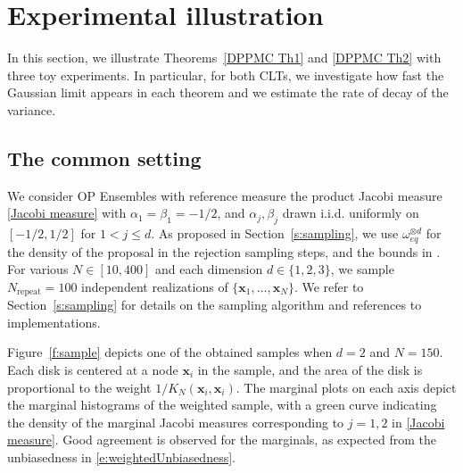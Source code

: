 \documentclass[a4paper,11pt]{article}
\numberwithin{equation}{section}
\theoremstyle{definition}
\newcommand{\rev}[1]{#1}
\newcommand{\bs}{\boldsymbol}
\newcommand{\bv}{\mathbf}
\renewcommand{\leq}{\leqslant}
\renewcommand{\phi}{\varphi}
\def\bx{{\bv x}}
\begin{document}



\section{Experimental illustration}
\label{s:experiments}
\rev{In this section, we illustrate Theorems~\ref{DPPMC Th1} and \ref{DPPMC Th2} with three toy experiments}. In particular, for both CLTs, we investigate how
fast the Gaussian limit appears in each theorem and we estimate the rate of decay of the variance.

\subsection{The common setting}
\label{s:commonSetting}
We consider OP Ensembles with reference measure the product Jacobi measure
\eqref{Jacobi measure} with $\alpha_1=\beta_1=-1/2$, and $\alpha_j,\beta_j$
drawn i.i.d. uniformly on $[-1/2,1/2]$ for $1 < j\leq d$. As proposed in
Section~\ref{s:sampling}, we use \rev{$\omega_{eq}^{\otimes d}$} for the density of the proposal in the rejection sampling steps, and the bounds in \citep{Gau09}. For various $N\in [10,400]$ and each dimension $d\in \{1,2,3\}$, we sample $N_{\text{repeat}} = 100$ independent realizations of $\{\bx_1,\dots,\bx_N\}$. We refer to Section~\ref{s:sampling} for details on the sampling algorithm and references to implementations.

Figure~\ref{f:sample} depicts one of the obtained samples when $d=2$ and $N=150$. Each disk is centered at a node $\bv x_i$ in the sample, and the area of the disk is proportional to the weight $1/K_N(\bv x_i,\bv x_i)$. The marginal plots on each axis
depict the marginal histograms of the  weighted sample, with a green curve
indicating the density of the marginal Jacobi measures corresponding to $j=1,2$
in \eqref{Jacobi measure}. Good agreement is observed for the marginals, as
expected from the unbiasedness in \eqref{e:weightedUnbiasedness}.
\end{document}

